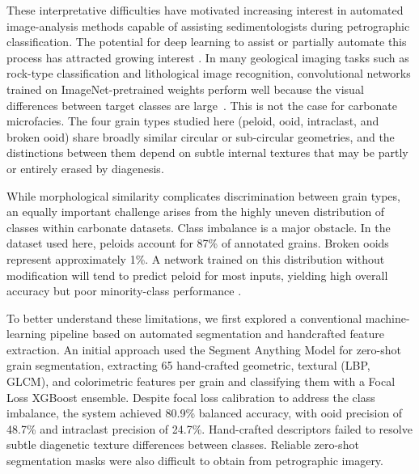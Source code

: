 \documentclass[a4paper,fleqn]{cas-dc}
\begin{document}
These interpretative difficulties have motivated increasing interest in automated image-analysis methods capable of assisting sedimentologists during petrographic classification. The potential for deep learning to assist or partially automate this process has attracted growing interest \citep{koeshidayatullah2020, pireslima2020, liu2020}. In many geological imaging tasks such as rock-type classification and lithological image recognition, convolutional networks trained on ImageNet-pretrained weights perform well because the visual differences between target classes are large~\citep{houshmand2022rock,xu2021deep}. This is not the case for carbonate microfacies. The four grain types studied here (peloid, ooid, intraclast, and broken ooid) share broadly similar circular or sub-circular geometries, and the distinctions between them depend on subtle internal textures that may be partly or entirely erased by diagenesis.

While morphological similarity complicates discrimination between grain types, an equally important challenge arises from the highly uneven distribution of classes within carbonate datasets. Class imbalance is a major obstacle. In the dataset used here, peloids account for 87\% of annotated grains. Broken ooids represent approximately 1\%. A network trained on this distribution without modification will tend to predict peloid for most inputs, yielding high overall accuracy but poor minority-class performance \citep{johnson2019imbalance}.

To better understand these limitations, we first explored a conventional machine-learning pipeline based on automated segmentation and handcrafted feature extraction. An initial approach used the Segment Anything Model \citep{kirillov2023sam} for zero-shot grain segmentation, extracting 65 hand-crafted geometric, textural (LBP, GLCM), and colorimetric features per grain and classifying them with a Focal Loss XGBoost ensemble. Despite focal loss calibration to address the class imbalance, the system achieved 80.9\% balanced accuracy, with ooid precision of 48.7\% and intraclast precision of 24.7\%. Hand-crafted descriptors failed to resolve subtle diagenetic texture differences between classes. Reliable zero-shot segmentation masks were also difficult to obtain from petrographic imagery. %
\end{document}
